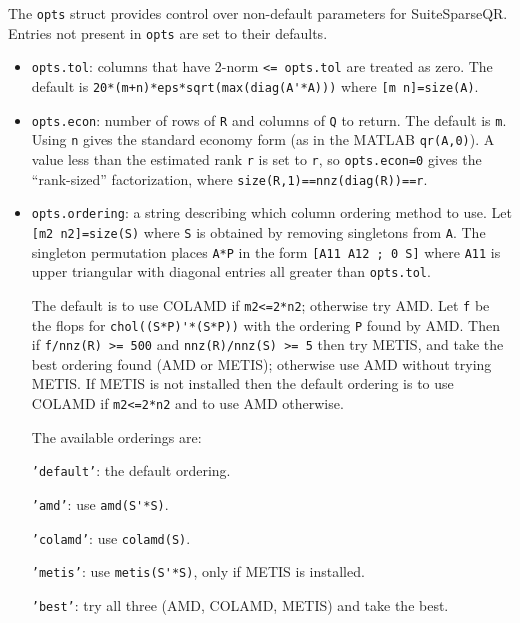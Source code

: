 \documentclass[12pt]{article}
\begin{document}
The \verb'opts' struct provides control over non-default parameters for
SuiteSparseQR.  Entries not present in \verb'opts' are set to their defaults.

\begin{itemize}

    \item \verb'opts.tol':   columns that have 2-norm \verb'<= opts.tol' are
    treated as zero. The default is \verb"20*(m+n)*eps*sqrt(max(diag(A'*A)))"
    where \verb'[m n]=size(A)'.

    \item \verb'opts.econ':  number of rows of \verb'R' and columns of \verb'Q'
    to return.  The default is \verb'm'.  Using \verb'n' gives the standard
    economy form (as in the MATLAB \verb'qr(A,0)').  A value less than the
    estimated rank \verb'r' is set to \verb'r', so \verb'opts.econ=0' gives
    the ``rank-sized'' factorization, where \verb'size(R,1)==nnz(diag(R))==r'.

    \item \verb'opts.ordering': a string describing which column ordering
    method to use.  Let \newline 
    \verb'[m2 n2]=size(S)' where \verb'S' is obtained by
    removing singletons from \verb'A'.  The singleton permutation places
    \verb'A*P' in the form \verb'[A11 A12 ; 0 S]' where \verb'A11' is upper
    triangular with diagonal entries all greater than \verb'opts.tol'.

    The default is to use COLAMD if \verb'm2<=2*n2'; otherwise try AMD.  Let
    \verb'f' be the flops for \verb"chol((S*P)'*(S*P))" with the ordering
    \verb'P' found by AMD.  Then if \verb'f/nnz(R) >= 500' and
    \verb'nnz(R)/nnz(S) >= 5' then try METIS, and take the best ordering found
    (AMD or METIS); otherwise use AMD without trying METIS.  If METIS is not
    installed then the default ordering is to use COLAMD if \verb'm2<=2*n2' and
    to use AMD otherwise.

    The available orderings are:

       {\tt 'default'}: the default ordering.

       {\tt 'amd'}: use \verb"amd(S'*S)".

       {\tt 'colamd'}: use \verb"colamd(S)".

       {\tt 'metis'}: use \verb"metis(S'*S)", only if METIS is
       installed.

       {\tt 'best'}: try all three (AMD, COLAMD, METIS) and take the
       best.


\end{itemize}
\end{document}
